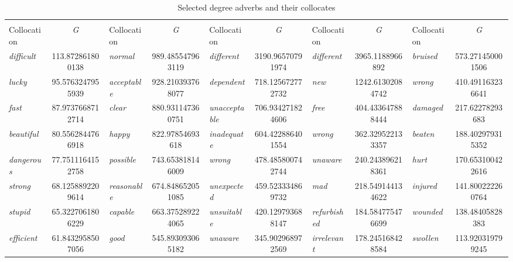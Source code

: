 \begin{sidewaystable}
\caption{Selected degree adverbs and their collocates\label{tab:degreeadverbs}}
\begin{tabular}{*{5}{lS[table-format=3.2,table-figures-decimal=2]}}
\lsptoprule
{} &  &  &  & \\\cmidrule(lr){1-2}\cmidrule(lr){3-4}\cmidrule(lr){5-6}\cmidrule(lr){7-8}\cmidrule(lr){9-10}
Collocation & {\emph{G}} & Collocation & {\emph{G}} & Collocation & {\emph{G}} & Collocation & {\emph{G}} & Collocation & {\emph{G}} \\
\midrule
\textit{difficult} & 113.872861800138 & \textit{normal} & 989.485547963119 & \textit{different} & 3190.96570791974 & \textit{different} & 3965.1188966892 & \textit{bruised} & 573.271450001506 \\
\textit{lucky} & 95.5763247955939 & \textit{acceptable} & 928.210393768077 & \textit{dependent} & 718.125672772732 & \textit{new} & 1242.61302084742 & \textit{wrong} & 410.491163236641 \\
\textit{fast} & 87.9737668712714 & \textit{clear} & 880.931147360751 & \textit{unacceptable} & 706.934271824606 & \textit{free} & 404.433647888444 & \textit{damaged} & 217.62278293683 \\
\textit{beautiful} & 80.5562844766918 & \textit{happy} & 822.97854693618 & \textit{inadequate} & 604.422886401554 & \textit{wrong} & 362.329522133357 & \textit{beaten} & 188.402979315352 \\
\textit{dangerous} & 77.7511164152758 & \textit{possible} & 743.653818146009 & \textit{wrong} & 478.485800742744 & \textit{unaware} & 240.243896218361 & \textit{hurt} & 170.653100422616 \\
\textit{strong} & 68.1258892209614 & \textit{reasonable} & 674.848652051085 & \textit{unexpected} & 459.523334869732 & \textit{mad} & 218.549144134622 & \textit{injured} & 141.800222260764 \\
\textit{stupid} & 65.3227061806229 & \textit{capable} & 663.375289224065 & \textit{unsuitable} & 420.129793688147 & \textit{refurbished} & 184.584775476699 & \textit{wounded} & 138.48405828383 \\
\textit{efficient} & 61.8432958507056 & \textit{good} & 545.893093065182 & \textit{unaware} & 345.902968972569 & \textit{irrelevant} & 178.245168428584 & \textit{swollen} & 113.920319799245 \\

\end{tabular}
\end{sidewaystable}
